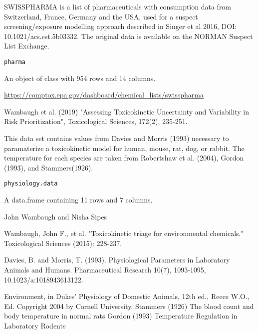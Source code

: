 \documentclass[a4paper]{book}
\begin{document}
%
\begin{Description}\relax
SWISSPHARMA is a list of pharmaceuticals with consumption data from
Switzerland, France, Germany and the USA, used for a suspect
screening/exposure modelling approach described in
Singer et al 2016, DOI: 10.1021/acs.est.5b03332. The original data is
available on the NORMAN Suspect List Exchange.
\end{Description}
%
\begin{Usage}
\begin{verbatim}
pharma
\end{verbatim}
\end{Usage}
%
\begin{Format}
An object of class  with 954 rows and 14 columns.
\end{Format}
%
\begin{Source}\relax
\url{https://comptox.epa.gov/dashboard/chemical_lists/swisspharma}
\end{Source}
%
\begin{References}\relax
Wambaugh et al. (2019) "Assessing Toxicokinetic Uncertainty and
Variability in Risk Prioritization", Toxicological Sciences, 172(2), 235-251.
\end{References}
%
\begin{Description}\relax
This data set contains values from Davies and Morris (1993) necessary to
paramaterize a toxicokinetic model for human, mouse, rat, dog, or rabbit.
The temperature for each species are taken from Robertshaw et al. (2004),
Gordon (1993), and Stammers(1926).
\end{Description}
%
\begin{Usage}
\begin{verbatim}
physiology.data
\end{verbatim}
\end{Usage}
%
\begin{Format}
A data.frame containing 11 rows and 7 columns.
\end{Format}
%
\begin{Author}\relax
John Wambaugh and Nisha Sipes
\end{Author}
%
\begin{Source}\relax
Wambaugh, John F., et al. "Toxicokinetic triage for environmental
chemicals." Toxicological Sciences (2015): 228-237.
\end{Source}
%
\begin{References}\relax
Davies, B. and Morris, T. (1993). Physiological Parameters in
Laboratory Animals and Humans. Pharmaceutical Research 10(7), 1093-1095,
10.1023/a:1018943613122.  

Environment, in Dukes' Physiology of Domestic Animals, 12th ed., Reece W.O.,
Ed. Copyright 2004 by Cornell University.  Stammers (1926) The blood count
and body temperature in normal rats Gordon (1993) Temperature Regulation in
Laboratory Rodents
\end{References}
\end{document}
